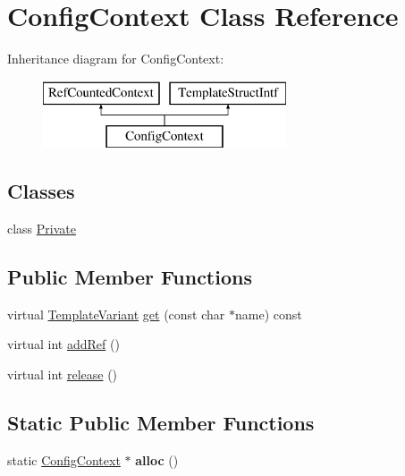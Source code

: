 \hypertarget{class_config_context}{}\section{Config\+Context Class Reference}
\label{class_config_context}
Inheritance diagram for Config\+Context\+:\begin{figure}[H]
\begin{center}
\leavevmode
\includegraphics[height=2.000000cm]{class_config_context}
\end{center}
\end{figure}
\subsection*{Classes}
\begin{DoxyCompactItemize}
\item 
class \mbox{\hyperlink{class_config_context_1_1_private}{Private}}
\end{DoxyCompactItemize}
\subsection*{Public Member Functions}
\begin{DoxyCompactItemize}
\item 
virtual \mbox{\hyperlink{class_template_variant}{Template\+Variant}} \mbox{\hyperlink{class_config_context_aa961d7f2814f0160b8eb3ddc52c18ddd}{get}} (const char $\ast$name) const
\item 
virtual int \mbox{\hyperlink{class_config_context_a6e870043f96de613f7f00e10aa57359e}{add\+Ref}} ()
\item 
virtual int \mbox{\hyperlink{class_config_context_a56eb8523197fa488cb099b47808b7ba7}{release}} ()
\end{DoxyCompactItemize}
\subsection*{Static Public Member Functions}
\begin{DoxyCompactItemize}
\item 
\mbox{\label{class_config_context_ac23123d89936c3646711f891d5ad31da}} 
static \mbox{\hyperlink{class_config_context}{Config\+Context}} $\ast$ {\bfseries alloc} ()
\end{DoxyCompactItemize}


